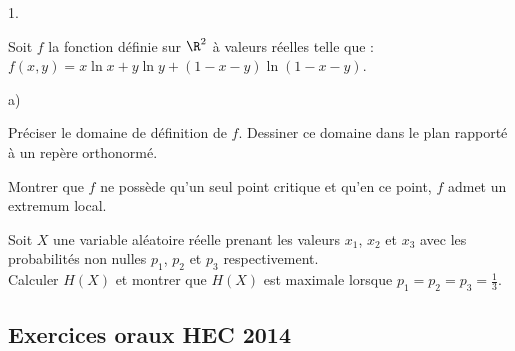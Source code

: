 \begin{exerciceAP}
\begin{noliste}{1.}
  \item Soit $f$ la fonction définie sur $\R^2$ à valeurs réelles
    telle que : $f(x,y) = x \ln x + y \ln y + (1-x-y) \ln
    (1-x-y)$. 
    \begin{noliste}{a)}
    \setlength{\itemsep}{2mm}
    \item Préciser le domaine de définition de $f$. Dessiner ce
      domaine dans le plan rapporté à un repère orthonormé.
    \item Montrer que $f$ ne possède qu'un seul point critique et
      qu'en ce point, $f$ admet un extremum local.
    \item Soit $X$ une variable aléatoire réelle prenant les valeurs
      $x_1$, $x_2$ et $x_3$ avec les probabilités non nulles $p_1$,
      $p_2$ et $p_3$ respectivement.\\

      Calculer $H(X)$ et montrer que $H(X)$ est maximale lorsque
      $p_1=p_2=p_3 = \frac{1}{3}$.
    \end{noliste}   
  \end{noliste}
\end{exerciceAP} 


\subsection*{Exercices oraux HEC 2014}


